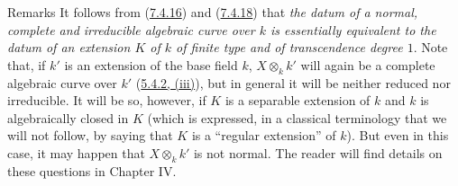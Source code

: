 \begin{namedtheorem}[7.4.19]{Remarks}
\label{II.7.4.19}
It follows from \textup{(\hyperref[II.7.4.16]{7.4.16})} and
\textup{(\hyperref[II.7.4.18]{7.4.18})} that \emph{the datum of a normal, complete
and irreducible algebraic curve over $k$ is essentially equivalent to
the datum of an extension $K$ of $k$ of finite type and of transcendence
degree $1$}. Note that, if $k'$ is an extension of the base field
$k$, $X\otimes_k k'$ will again be a complete algebraic curve over $k'$
\textup{(\hyperref[II.5.4.2]{5.4.2, (iii)})}, but in general it will be neither
reduced nor irreducible. It will be so, however, if $K$ is a separable
extension of $k$ and $k$ is algebraically closed in $K$ (which is expressed,
in a classical terminology that we will not follow, by saying that $K$ is a
``regular extension'' of $k$). But even in this case, it may happen that
$X\otimes_k k'$ is not normal. The reader will find details on these
questions in Chapter IV.
\end{namedtheorem}

